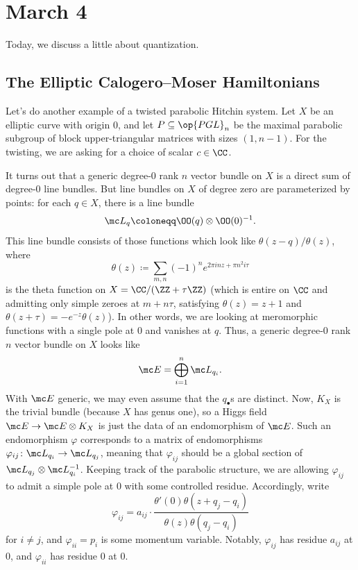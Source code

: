 \documentclass[../notes.tex]{subfiles}
\begin{document}
\section{March 4}
Today, we discuss a little about quantization.

\subsection{The Elliptic Calogero--Moser Hamiltonians}
Let's do another example of a twisted parabolic Hitchin system. Let $X$ be an elliptic curve with origin $0$, and let $P\subseteq\op{PGL}_n$ be the maximal parabolic subgroup of block upper-triangular matrices with sizes $(1,n-1)$. For the twisting, we are asking for a choice of scalar $c\in\CC$.

It turns out that a generic degree-$0$ rank $n$ vector bundle on $X$ is a direct sum of degree-$0$ line bundles. But line bundles on $X$ of degree zero are parameterized by points: for each $q\in X$, there is a line bundle
\[\mc L_q\coloneqq\OO(q)\otimes\OO(0)^{-1}.\]
This line bundle consists of those functions which look like $\theta(z-q)/\theta(z)$, where
\[\theta(z)\coloneqq\sum_{m,n}(-1)^ne^{2\pi inz+\pi n^2i\tau}\]
is the theta function on $X=\CC/(\ZZ+\tau\ZZ)$ (which is entire on $\CC$ and admitting only simple zeroes at $m+n\tau$, satisfying $\theta(z)=z+1$ and $\theta(z+\tau)=-e^{-z}\theta(z)$). In other words, we are looking at meromorphic functions with a single pole at $0$ and vanishes at $q$. Thus, a generic degree-$0$ rank $n$ vector bundle on $X$ looks like
\[\mc E=\bigoplus_{i=1}^n\mc L_{q_i}.\]
With $\mc E$ generic, we may even assume that the $q_\bullet$s are distinct. Now, $K_X$ is the trivial bundle (because $X$ has genus one), so a Higgs field $\mc E\to\mc E\otimes K_X$ is just the data of an endomorphism of $\mc E$. Such an endomorphism $\varphi$ corresponds to a matrix of endomorphisms $\varphi_{ij}\colon\mc L_{q_i}\to\mc L_{q_j}$, meaning that $\varphi_{ij}$ should be a global section of $\mc L_{q_j}\otimes\mc L_{q_i}^{-1}$. Keeping track of the parabolic structure, we are allowing $\varphi_{ij}$ to admit a simple pole at $0$ with some controlled residue. Accordingly, write
\[\varphi_{ij}=a_{ij}\cdot\frac{\theta'(0)\theta(z+q_j-q_i)}{\theta(z)\theta(q_j-q_i)}\]
for $i\ne j$, and $\varphi_{ii}=p_i$ is some momentum variable. Notably, $\varphi_{ij}$ has residue $a_{ij}$ at $0$, and $\varphi_{ii}$ has residue $0$ at $0$.
\end{document}
